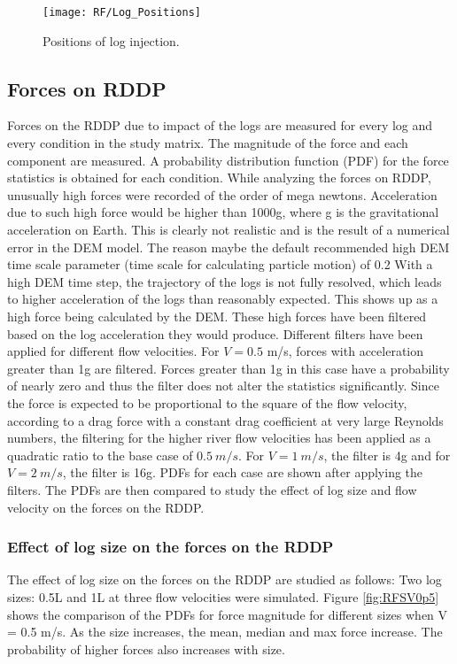 \begin{figure}
\centering
\texttt{[image: RF/Log\_Positions]}
\caption{\label{fig:Log_Positions}Positions of log injection.}
\end{figure} 

\FloatBarrier
\subsection{Forces on RDDP}
Forces on the RDDP due to impact of the logs are measured for every log and every condition in the study matrix. The magnitude of the force and each component are measured. A probability distribution function (PDF) for the force statistics is obtained for each condition. While analyzing the forces on RDDP, unusually high forces were recorded of the order of mega newtons. Acceleration due to such high force would be higher than 1000g, where g is the gravitational acceleration on Earth. This is clearly not realistic and is the result of a numerical error in the DEM model. The reason maybe the default recommended high DEM time scale parameter (time scale for calculating particle motion) of 0.2 %
With a high DEM time step, the trajectory of the logs is not fully resolved, which leads to higher acceleration of the logs than reasonably expected. This shows up as a high force being calculated by the DEM. These high forces have been filtered based on the log acceleration they would produce. Different filters have been applied for different flow velocities. For $V = 0.5$ m/s, forces with acceleration greater than 1g are filtered. Forces greater than 1g in this case have a probability of nearly zero and thus the filter does not alter the statistics significantly. Since the force is expected to be proportional to the square of the flow velocity, according to a drag force with a constant drag coefficient at very large Reynolds numbers, the filtering for the higher river flow velocities has been applied as a quadratic ratio to the base case of $0.5~m/s$. For $V = 1~m/s$, the filter is 4g and for $V = 2~m/s$, the filter is 16g. PDFs for each case are shown after applying the filters. The PDFs are then compared to study the effect of log size and flow velocity on the forces on the RDDP.\\
\subsubsection{Effect of log size on the forces on the RDDP}
The effect of log size on the forces on the RDDP are studied as follows: Two log sizes: 0.5L and 1L at three flow velocities were simulated. Figure \ref{fig:RFSV0p5} shows the comparison of the PDFs for force magnitude for different sizes when V = 0.5 m/s. As the size increases, the mean, median and max force increase. The probability of higher forces also increases with size. 


